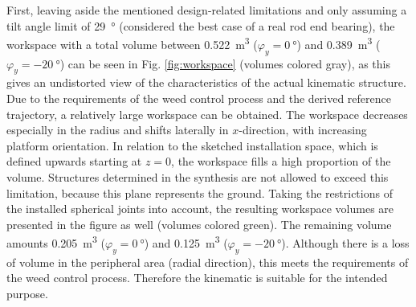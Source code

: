 \documentclass[runningheads]{llncs}
\begin{document}
First, leaving aside the mentioned design-related limitations and only assuming a tilt angle limit of \SI{29}{\degree} (considered the best case of a real rod end bearing), the workspace with a total volume between \SI{0.522}{\cubic\metre} ($\varphi_y = \SI{0}{\degree}$) and \SI{0.389}{\cubic\metre} ($\varphi_y = \SI{-20}{\degree}$) can be seen in Fig. \ref{fig:workspace} (volumes colored gray), as this gives an undistorted view of the characteristics of the actual kinematic structure.
Due to the requirements of the weed control process and the derived reference trajectory, a relatively large workspace can be obtained.
The workspace decreases especially in the radius and shifts laterally in $x$-direction, with increasing platform orientation. 
In relation to the sketched installation space, which is defined upwards starting at $z=0$, the workspace fills a high proportion of the volume. 
Structures determined in the synthesis are not allowed to exceed this limitation, because this plane represents the ground.
Taking the restrictions of the installed spherical joints into account, the resulting workspace volumes are presented in the figure as well (volumes colored green). 
The remaining volume amounts \SI{0.205}{\cubic\metre} ($\varphi_y = \SI{0}{\degree}$) and \SI{0.125}{\cubic\metre} ($\varphi_y = \SI{-20}{\degree}$). 
Although there is a loss of volume in the peripheral area (radial direction), this meets the requirements of the weed control process. Therefore the kinematic is suitable for the intended purpose. 

\end{document}
